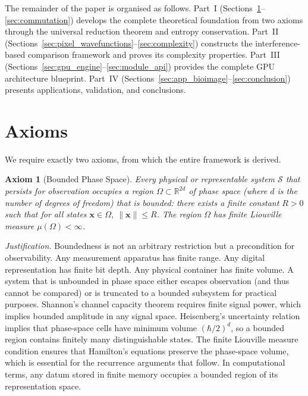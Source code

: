 \documentclass[11pt,twocolumn,a4paper]{article}
\newtheorem{axiom}{Axiom}
\newcommand{\R}{\mathbb{R}}
\begin{document}

The remainder of the paper is organised as follows.
Part~I (Sections~\ref{sec:axioms}--\ref{sec:commutation}) develops the
complete theoretical foundation from two axioms through the universal
reduction theorem and entropy conservation.
Part~II (Sections~\ref{sec:pixel_wavefunctions}--\ref{sec:complexity})
constructs the interference-based comparison framework and proves its
complexity properties.
Part~III (Sections~\ref{sec:gpu_engine}--\ref{sec:module_api})
provides the complete GPU architecture blueprint.
Part~IV (Sections~\ref{sec:app_bioimage}--\ref{sec:conclusion})
presents applications, validation, and conclusions.


\section{Axioms}
\label{sec:axioms}

We require exactly two axioms, from which the entire framework is derived.

\begin{axiom}[Bounded Phase Space]
\label{ax:bounded}
Every physical or representable system $\mathcal{S}$ that persists for
observation occupies a region $\Omega \subset \R^{2d}$ of phase space
(where $d$ is the number of degrees of freedom) that is bounded:
there exists a finite constant $R > 0$ such that for all states
$\mathbf{x} \in \Omega$, $\|\mathbf{x}\| \leq R$. The region $\Omega$
has finite Liouville measure $\mu(\Omega) < \infty$.
\end{axiom}

\noindent\emph{Justification.} Boundedness is not an arbitrary
restriction but a precondition for observability. Any measurement
apparatus has finite range. Any digital representation has finite bit
depth. Any physical container has finite volume. A system that is
unbounded in phase space either escapes observation (and thus cannot be
compared) or is truncated to a bounded subsystem for practical purposes.
Shannon's channel capacity theorem \citep{shannon1948} requires finite
signal power, which implies bounded amplitude in any signal space.
Heisenberg's uncertainty relation \citep{heisenberg1927} implies that
phase-space cells have minimum volume $(\hbar/2)^d$, so a bounded region
contains finitely many distinguishable states. The finite Liouville
measure condition \citep{liouville1838} ensures that Hamilton's equations
preserve the phase-space volume, which is essential for the recurrence
arguments that follow. In computational terms, any datum stored in finite
memory occupies a bounded region of its representation space.
\end{document}
